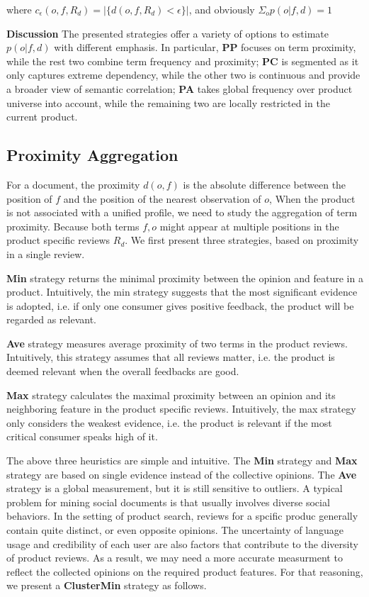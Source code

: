 \documentclass[preprint]{elsarticle}
\begin{document}
where  $c_\epsilon(o,f,R_d)=|\{d(o,f,R_d)<\epsilon\}|$, and obviously $\Sigma_o p(o|f,d)=1$


\textbf{Discussion} The presented strategies offer a variety of options to estimate $p(o|f,d)$ with different emphasis. In particular, \textbf{PP} focuses on term proximity, while the rest two combine term frequency and proximity; \textbf{PC} is segmented as it only captures extreme dependency, while the other two is continuous and provide a broader view of semantic correlation; \textbf{PA} takes global frequency over product universe into account, while the remaining two are locally restricted in the current product.

\subsection{Proximity Aggregation}
For a document, the proximity $d(o,f)$ is the absolute difference between the position of $f$ and the position of the nearest observation of $o$, When the product is not associated with a unified profile, we need to study the aggregation of term proximity. Because both terms $f,o$ might appear at multiple positions in the product specific reviews $R_d$. We first present three strategies, based on proximity in a single review.

\textbf{Min} strategy returns the minimal proximity between the opinion and feature in a product. Intuitively, the min strategy suggests that the most significant evidence is adopted, i.e. if only one consumer gives positive feedback, the product will be regarded as relevant.

\textbf{Ave} strategy measures average proximity of two terms in the product reviews. Intuitively, this strategy assumes that all reviews matter, i.e. the product is deemed relevant when the overall feedbacks are good.

\textbf{Max} strategy calculates the maximal proximity between an opinion and its neighboring feature in the product specific reviews. Intuitively, the max strategy only considers the weakest evidence, i.e. the product is relevant if the most critical consumer speaks high of it. 

The above three heuristics are simple and intuitive. The \textbf{Min} strategy and \textbf{Max} strategy are based on single evidence instead of the collective opinions. The \textbf{Ave} strategy is a global measurement, but it is still sensitive to outliers. A typical problem for mining social documents is that usually involves diverse social behaviors. In the setting of product search, reviews for a spcific produc generally contain quite distinct, or even opposite opinions. The uncertainty of language usage and credibility of each user are also factors that contribute to the diversity of product reviews. As a result, we may need a more accurate measurment to reflect the collected opinions on the required product features. For that reasoning, we present a \textbf{ClusterMin} strategy as follows. 
\end{document}
